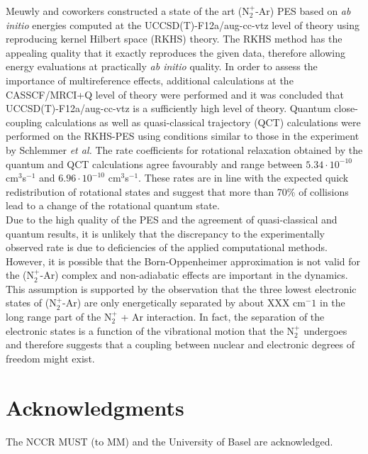 \documentclass[journal=jacsat,manuscript=article]{achemso}
\begin{document}
\noindent
Meuwly and coworkers\cite{unke.jcp.2016.n2plusargon,denisalpizar.2017.n2plusargon} constructed a state of the art (N$_2^+$-Ar) PES based on \textit{ab initio} energies computed at the UCCSD(T)-F12a/aug-cc-vtz level of theory using reproducing kernel Hilbert space (RKHS) theory.\cite{hollebeek.annrevphychem.1999.rkhs,unke.2017.rkhstoolkit} The RKHS method has the appealing quality that it exactly reproduces the given data, therefore allowing energy evaluations at practically \textit{ab initio} quality.\cite{unke.jcp.2016.n2plusargon} In order to assess the importance of multireference effects, additional calculations at the CASSCF/MRCI+Q level of theory were performed and it was concluded that UCCSD(T)-F12a/aug-cc-vtz is a sufficiently high level of theory.\cite{denisalpizar.2017.n2plusargon}
Quantum close-coupling calculations\cite{denisalpizar.2017.n2plusargon} as well as quasi-classical trajectory (QCT) calculations\cite{unke.jcp.2016.n2plusargon,denisalpizar.2017.n2plusargon} were performed on the RKHS-PES using conditions similar to those in the experiment by Schlemmer \textit{et al.}\cite{schlemmer.ijms.1999.n2plusargon} The rate coefficients for rotational relaxation obtained by the quantum and QCT calculations agree favourably and range between  $5.34 \cdot 10^{-10}$ cm$^3$s$^{-1}$ and $6.96 \cdot 10^{-10}$ cm$^3$s$^{-1}$.\cite{denisalpizar.2017.n2plusargon} These rates are in line with the expected quick redistribution of rotational states and suggest that more than 70\% of collisions lead to a change of the rotational quantum state.\\
\noindent Due to the high quality of the PES and the agreement of quasi-classical and quantum results, it is unlikely that the discrepancy to the experimentally observed rate is due to deficiencies of the applied computational methods. However, it is possible that the Born-Oppenheimer approximation is not valid for the (N$_2^+$-Ar) complex and non-adiabatic effects are important in the dynamics. This assumption is supported by the observation that the three lowest electronic states of  (N$_2^+$-Ar) are only energetically separated by about XXX cm$^-1$ in the long range part of the N$_2^+$ + Ar interaction. In fact, the separation of the electronic states is a function of the vibrational motion that the N$_2^+$ undergoes and therefore suggests that a coupling between nuclear and electronic degrees of freedom might exist.
    
\section*{Acknowledgments}
The NCCR MUST (to MM) and the University of Basel are acknowledged.



\end{document}
